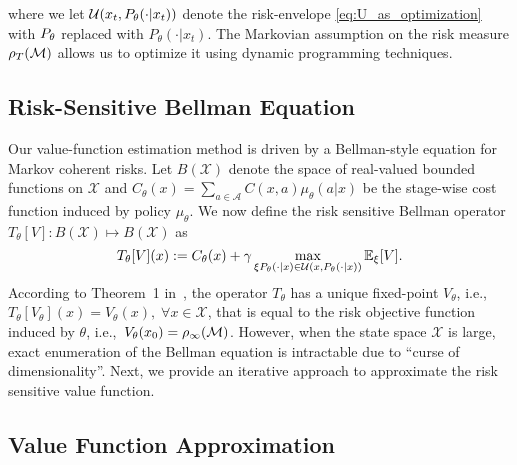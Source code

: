 where we let ${\mathcal{U}}(x_t,P_\theta(\cdot |x_t))$ denote the risk-envelope \eqref{eq:U_as_optimization} with $P_{\theta}$ replaced with $P_\theta(\cdot |x_t)$. The Markovian assumption on the risk measure $\rho_T(\mathcal{M})$ allows us to optimize it using dynamic programming techniques.
\subsection{Risk-Sensitive Bellman Equation}
\label{subsec:Risk-Bellman}

Our value-function estimation method is driven by a Bellman-style equation for Markov coherent risks. Let $B(\mathcal X)$ denote the space of real-valued bounded functions on $\mathcal X$ and $C_\theta(x)=\sum_{a\in\mathcal A}C(x,a)\mu_\theta(a|x)$ be the stage-wise cost function induced by policy $\mu_\theta$. We now define the risk sensitive Bellman operator $T_{\theta}[V] : B(\mathcal X) \mapsto B(\mathcal X)$ as
%
\begin{equation}\label{eq:T_supp}
T_{\theta}[V](x) :=C_\theta(x) + \gamma\max_{\xi P_\theta(\cdot |x)\in {\mathcal{U}}(x,P_\theta(\cdot |x))}\mathbb E_{\xi}[V].
\end{equation}
%
According to Theorem~1 in~\citet{ruszczynski2010risk}, the operator $T_\theta$ has a unique fixed-point $V_\theta$, i.e.,~ $T_{\theta}[V_\theta](x)=V_\theta(x),\;\forall x\in\mathcal{X}$, that is equal to the risk objective function induced by $\theta$, i.e.,~$V_\theta(x_0)=\rho_\infty(\mathcal{M})$. However, when the state space $\mathcal X$ is large, exact enumeration of the Bellman equation is intractable due to ``curse of dimensionality''. Next, we provide an iterative approach to approximate the risk sensitive value function.


\subsection{Value Function Approximation}
\label{sec:val_fn_rpprox}

